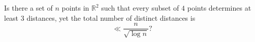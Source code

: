 Is there a set of $n$ points in $\mathbb{R}^2$ such that every subset of $4$ points determines at least $3$ distances, yet the total number of distinct distances is\[\ll \frac{n}{\sqrt{\log n}}?\]